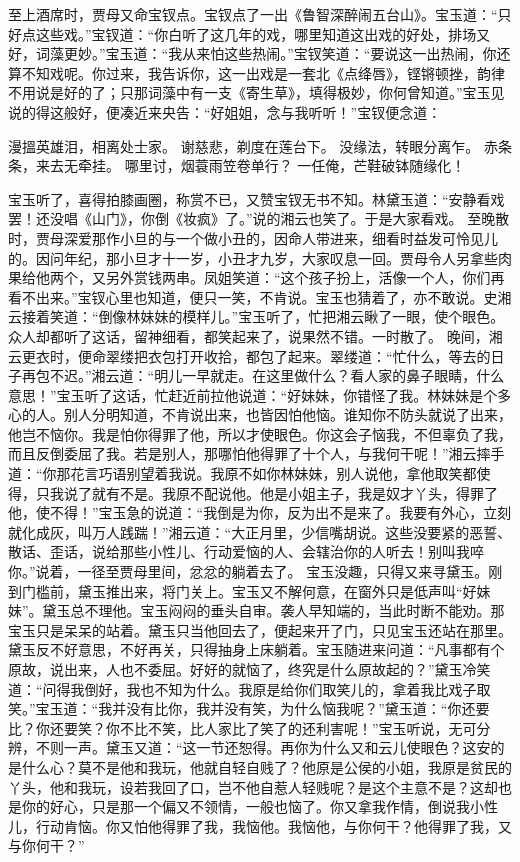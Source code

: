 \documentclass[12pt,oneside]{book}
\begin{document}
至上酒席时，贾母又命宝钗点。宝钗点了一出《鲁智深醉闹五台山》。宝玉道：“只好点这些戏。”宝钗道：“你白听了这几年的戏，哪里知道这出戏的好处，排场又好，词藻更妙。”宝玉道：“我从来怕这些热闹。”宝钗笑道：“要说这一出热闹，你还算不知戏呢。你过来，我告诉你，这一出戏是一套北《点绛唇》，铿锵顿挫，韵律不用说是好的了；只那词藻中有一支《寄生草》，填得极妙，你何曾知道。”宝玉见说的得这般好，便凑近来央告：“好姐姐，念与我听听！”宝钗便念道：

漫搵英雄泪，相离处士家。
谢慈悲，剃度在莲台下。
没缘法，转眼分离乍。
赤条条，来去无牵挂。
哪里讨，烟蓑雨笠卷单行？
一任俺，芒鞋破钵随缘化！

宝玉听了，喜得拍膝画圈，称赏不已，又赞宝钗无书不知。林黛玉道：“安静看戏罢！还没唱《山门》，你倒《妆疯》了。”说的湘云也笑了。于是大家看戏。
至晚散时，贾母深爱那作小旦的与一个做小丑的，因命人带进来，细看时益发可怜见儿的。因问年纪，那小旦才十一岁，小丑才九岁，大家叹息一回。贾母令人另拿些肉果给他两个，又另外赏钱两串。凤姐笑道：“这个孩子扮上，活像一个人，你们再看不出来。”宝钗心里也知道，便只一笑，不肯说。宝玉也猜着了，亦不敢说。史湘云接着笑道：“倒像林妹妹的模样儿。”宝玉听了，忙把湘云瞅了一眼，使个眼色。众人却都听了这话，留神细看，都笑起来了，说果然不错。一时散了。
晚间，湘云更衣时，便命翠缕把衣包打开收拾，都包了起来。翠缕道：“忙什么，等去的日子再包不迟。”湘云道：“明儿一早就走。在这里做什么？看人家的鼻子眼睛，什么意思！”宝玉听了这话，忙赶近前拉他说道：“好妹妹，你错怪了我。林妹妹是个多心的人。别人分明知道，不肯说出来，也皆因怕他恼。谁知你不防头就说了出来，他岂不恼你。我是怕你得罪了他，所以才使眼色。你这会子恼我，不但辜负了我，而且反倒委屈了我。若是别人，那哪怕他得罪了十个人，与我何干呢！”湘云摔手道：“你那花言巧语别望着我说。我原不如你林妹妹，别人说他，拿他取笑都使得，只我说了就有不是。我原不配说他。他是小姐主子，我是奴才丫头，得罪了他，使不得！”宝玉急的说道：“我倒是为你，反为出不是来了。我要有外心，立刻就化成灰，叫万人践踹！”湘云道：“大正月里，少信嘴胡说。这些没要紧的恶誓、散话、歪话，说给那些小性儿、行动爱恼的人、会辖治你的人听去！别叫我啐你。”说着，一径至贾母里间，忿忿的躺着去了。
宝玉没趣，只得又来寻黛玉。刚到门槛前，黛玉推出来，将门关上。宝玉又不解何意，在窗外只是低声叫“好妹妹”。黛玉总不理他。宝玉闷闷的垂头自审。袭人早知端的，当此时断不能劝。那宝玉只是呆呆的站着。黛玉只当他回去了，便起来开了门，只见宝玉还站在那里。黛玉反不好意思，不好再关，只得抽身上床躺着。宝玉随进来问道：“凡事都有个原故，说出来，人也不委屈。好好的就恼了，终究是什么原故起的？”黛玉冷笑道：“问得我倒好，我也不知为什么。我原是给你们取笑儿的，拿着我比戏子取笑。”宝玉道：“我并没有比你，我并没有笑，为什么恼我呢？”黛玉道：“你还要比？你还要笑？你不比不笑，比人家比了笑了的还利害呢！”宝玉听说，无可分辨，不则一声。黛玉又道：“这一节还恕得。再你为什么又和云儿使眼色？这安的是什么心？莫不是他和我玩，他就自轻自贱了？他原是公侯的小姐，我原是贫民的丫头，他和我玩，设若我回了口，岂不他自惹人轻贱呢？是这个主意不是？这却也是你的好心，只是那一个偏又不领情，一般也恼了。你又拿我作情，倒说我小性儿，行动肯恼。你又怕他得罪了我，我恼他。我恼他，与你何干？他得罪了我，又与你何干？”
\end{document}
